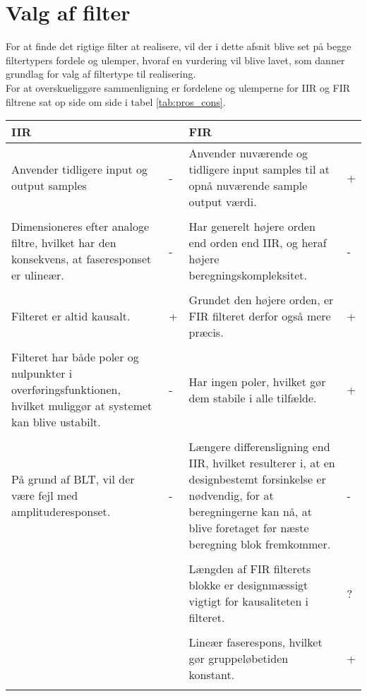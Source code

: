 \section{Valg af filter}\label{sec:dec_filter}
For at finde det rigtige filter at realisere, vil der i dette afsnit blive set på begge filtertypers fordele og ulemper, hvoraf en vurdering vil blive lavet, som danner grundlag for valg af filtertype til realisering. \\
For at overskueliggøre sammenligning er fordelene og ulemperne for IIR og FIR filtrene sat op side om side i tabel \ref{tab:pros_cons}.

\begin{table*}[ht]
\caption{Fordele og ulemper for IIR og FIR}
\centering
\label{tab:pros_cons}
\begin{tabular}{p{0.45\linewidth}p{0.05\linewidth}p{0.45\linewidth}p{0.05\linewidth}}
\toprule
IIR &  &FIR & \\
\midrule 
Anvender tidligere input og output samples & - & Anvender nuværende og tidligere input samples til at opnå nuværende sample output værdi. & + \\
& & & \\
Dimensioneres efter analoge filtre, hvilket har den konsekvens, at faseresponset er ulineær. & - & Har generelt højere orden end orden end IIR, og heraf højere beregningskompleksitet. & - \\ 
& & & \\
Filteret er altid kausalt. & + & Grundet den højere orden, er FIR filteret derfor også mere præcis. & + \\	
& & & \\
Filteret har både poler og nulpunkter i overføringsfunktionen, hvilket muliggør at systemet kan blive ustabilt. & - & Har ingen poler, hvilket gør dem stabile i alle tilfælde. & + \\
& & & \\
På grund af BLT, vil der være fejl med amplituderesponset. & - & Længere differensligning end IIR, hvilket resulterer i, at en designbestemt forsinkelse er nødvendig, for at beregningerne kan nå, at blive foretaget før næste beregning blok fremkommer. & - \\
& & & \\
& & Længden af FIR filterets blokke er designmæssigt vigtigt for kausaliteten i filteret. & ? \\
& & & \\
& & Lineær faserespons, hvilket gør gruppeløbetiden konstant. & + \\
& & & \\
\bottomrule	
\end{tabular}
\end{table*}
\FloatBlock


